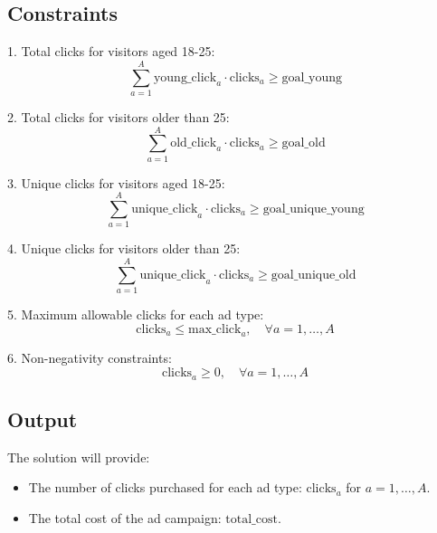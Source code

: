 \documentclass{article}
\begin{document}
\subsection*{Constraints}

1. Total clicks for visitors aged 18-25:
\[
\sum_{a=1}^{A} \text{young\_click}_{a} \cdot \text{clicks}_{a} \geq \text{goal\_young}
\]

2. Total clicks for visitors older than 25:
\[
\sum_{a=1}^{A} \text{old\_click}_{a} \cdot \text{clicks}_{a} \geq \text{goal\_old}
\]

3. Unique clicks for visitors aged 18-25:
\[
\sum_{a=1}^{A} \text{unique\_click}_{a} \cdot \text{clicks}_{a} \geq \text{goal\_unique\_young}
\]

4. Unique clicks for visitors older than 25:
\[
\sum_{a=1}^{A} \text{unique\_click}_{a} \cdot \text{clicks}_{a} \geq \text{goal\_unique\_old}
\]

5. Maximum allowable clicks for each ad type:
\[
\text{clicks}_{a} \leq \text{max\_click}_{a}, \quad \forall a = 1, \ldots, A
\]

6. Non-negativity constraints:
\[
\text{clicks}_{a} \geq 0, \quad \forall a = 1, \ldots, A
\]

\subsection*{Output}
The solution will provide:
\begin{itemize}
    \item The number of clicks purchased for each ad type: \( \text{clicks}_{a} \) for \( a = 1, \ldots, A \).
    \item The total cost of the ad campaign: \( \text{total\_cost} \).
\end{itemize}
\end{document}
